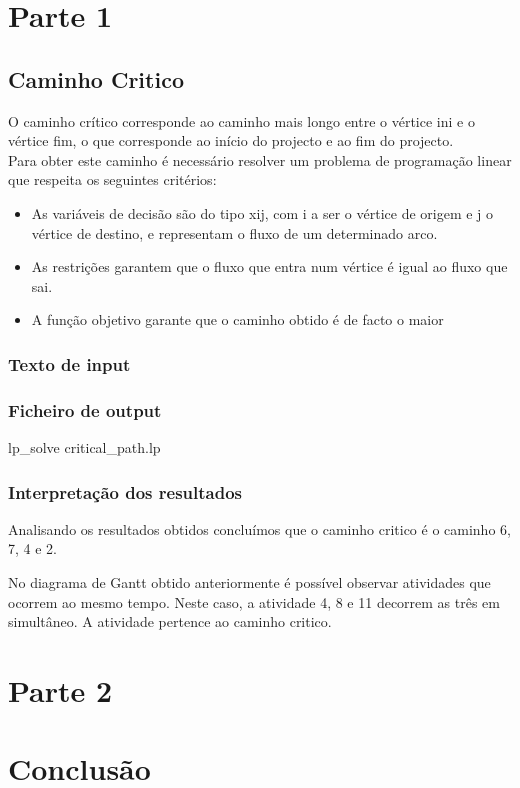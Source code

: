\documentclass[a4paper]{report}
\begin{document}
\chapter{Parte 1}
\section{Caminho Critico}
O caminho crítico corresponde ao caminho mais longo entre o vértice ini e o
vértice fim, o que corresponde ao início do projecto e  ao fim do projecto.\\
Para obter este caminho é necessário resolver um problema de programação linear
que respeita os seguintes critérios:\\
\begin{itemize}
    \item As variáveis de decisão são do tipo xij, com i a ser o vértice de origem e j o
vértice de destino, e representam o fluxo de um determinado arco.
    \item As restrições garantem que o fluxo que entra num vértice é igual ao fluxo que
sai.
    \item A função objetivo garante que o caminho obtido é de facto o maior
\end{itemize}

\subsection{Texto de input}


\pagebreak
\subsection{Ficheiro de output}
\bash[stdout]
lp_solve critical_path.lp
\END

\subsection{Interpretação dos resultados}
Analisando os resultados obtidos concluímos que o caminho critico é o caminho 6,
7, 4 e 2.


No diagrama de Gantt obtido anteriormente é possível observar atividades que
ocorrem ao mesmo tempo.
Neste caso, a atividade 4, 8 e 11 decorrem as três em simultâneo.
A atividade pertence ao caminho critico.


\chapter{Parte 2}


\chapter{Conclusão}
\end{document}
